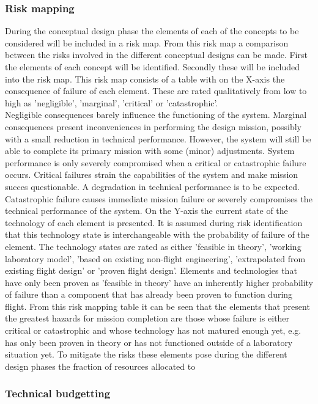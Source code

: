 \subsubsection{Risk mapping}
During the conceptual design phase the elements of each of the concepts to be considered will be included in a risk map. From this risk map a comparison between the risks involved in the different conceptual designs can be made. First the elements of each concept will be identified. Secondly these will be included into the risk map. This risk map consists of a table with on the X-axis the consequence of failure of each element. These are rated qualitatively from low to high as 'negligible', 'marginal', 'critical' or 'catastrophic'. \\
\noindent Negligible consequences barely influence the functioning of the system. Marginal consequences present inconveniences in performing the design mission, possibly with a small reduction in technical performance. However, the system will still be able to complete its primary mission with some (minor) adjustments. System performance is only severely compromised when a critical or catastrophic failure occurs. Critical failures strain the capabilities of the system and make mission succes questionable. A degradation in technical performance is to be expected. Catastrophic failure causes immediate mission failure or severely compromises the technical performance of the system. 
\noindent On the Y-axis the current state of the technology of each element is presented. It is assumed during risk identification that this technology state is interchangeable with the probability of failure of the element. The technology states are rated as either 'feasible in theory', 'working laboratory model', 'based on existing non-flight engineering', 'extrapolated from existing flight design' or 'proven flight design'. Elements and technologies that have only been proven as 'feasible in theory' have an inherently higher probability of failure than a component that has already been proven to function during flight.
\noindent From this risk mapping table it can be seen that the elements that present the greatest hazards for mission completion are those whose failure is either critical or catastrophic and whose technology has not matured enough yet, e.g. has only been proven in theory or has not functioned outside of a laboratory situation yet. To mitigate the risks these elements pose during the different design phases the fraction of resources allocated to 

\subsubsection{Technical budgetting}